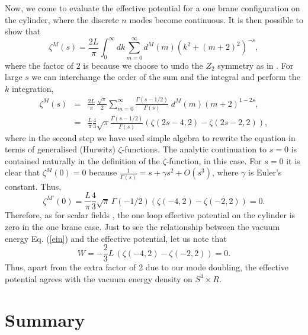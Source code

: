 \documentclass[a4paper,a4paper]{article}
\begin{document}
Now, we come to evaluate the effective potential for a one brane configuration on the
cylinder, where the discrete $n$ modes become continuous. 
It is then possible to show that
\begin{equation}
\zeta^M(s)=\frac{2L}{\pi}\int_0^\infty dk \sum_{m=0}^\infty d^M(m)
\left(k^2+(m+2)^2\right)^{-s},
\end{equation}
where the factor of $2$ is because we choose to undo the $Z_2$ symmetry as in 
\cite{GS}. For large $s$ we can interchange the order of the sum and the integral and 
perform the $k$ integration, 
\begin{eqnarray}
\zeta^M(s)&=&\frac{2L}{\pi}\,
\frac{\sqrt{\pi}}{2}\sum_{m=0}^\infty
\frac{\Gamma(s-1/2)}{\Gamma(s)}\;d^M(m)(m+2)^{1-2s},
\nonumber\\
&=&\frac{L}{\pi}\frac 4 3 \sqrt{\pi}\frac{\Gamma(s-1/2)}{\Gamma(s)}
\left(\zeta(2s-4,2)-\zeta(2s-2,2)\right),
\end{eqnarray}
where in the second step we have used simple algebra to rewrite the equation in 
terms of generalised (Hurwitz) $\zeta$-functions. The analytic continuation 
to $s=0$ is contained naturally in the definition of the $\zeta$-function, in this case.
For $s=0$ it is clear that $\zeta^M(0)=0$ because 
$\frac{1}{\Gamma(s)}=s+\gamma s^2+O(s^3)$,
where $\gamma$ is Euler's constant. Thus,
\begin{equation}
\label{1bravac}
\zeta^{M\prime}(0)=\frac{L}{\pi}\frac 4 3 \sqrt{\pi}\,\Gamma(-1/2)
\left(\zeta(-4,2)-\zeta(-2,2)\right)=0.
\end{equation}
Therefore, as for scalar fields \cite{NOZ,NS}, the one loop effective potential 
on the cylinder is zero in the one brane case. 
Just to see the relationship between the vacuum energy Eq. (\ref{ein}) and the 
effective potential, let us note that
\begin{equation}
W=-\frac 2 3 L\,\left(\zeta(-4,2)-\zeta(-2,2)\right)=0.
\end{equation}
Thus, apart from the extra factor of 2 due to our mode doubling, the effective 
potential agrees with the vacuum energy density on $S^4\times R$.

\section{Summary}
\end{document}
